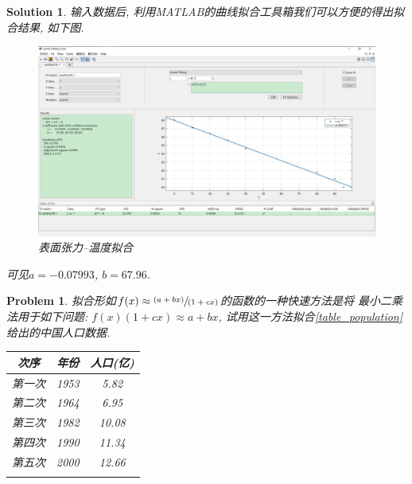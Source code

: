 \documentclass[a4paper, 12pt]{ctexart}
\let\oldtable\table
\let\oldendtable\endtable
\renewenvironment{table}
    {\par\nolinenumbers\oldtable}
    {\oldendtable\endnolinenumbers\par}
\theoremstyle{plain}
\newtheorem{problem}{Problem}[section]
\theoremstyle{plain}
\theoremstyle{plain}
\theoremstyle{nonumberplain}
\newtheorem{solution}{Solution}
\begin{document}
    \begin{solution}
        输入数据后, 利用MATLAB的曲线拟合工具箱我们可以方便的得出拟合结果, 如下图.
        \begin{figure}[H]
            \centering
            \includegraphics[scale=0.32]{tension.jpg}
            \caption{表面张力--温度拟合}
        \end{figure}
        可见$a = -0.07993$, $b = 67.96$.
    \end{solution}

    \begin{problem}
        拟合形如$f(x) \approx \sfrac{(a+bx)}{(1+cx)}$的函数的一种快速方法是将
        最小二乘法用于如下问题: $f(x)(1+cx)\approx a+bx$,
        试用这一方法拟合\ref{table_population}给出的中国人口数据.
        \begin{table}[H]
            \begin{center}
                \caption{中国人口数据}
                \label{table_population}
                \begin{tabular}{ccc}
                    \Xhline{1.2pt}
                    次序 & 年份 & 人口(亿)\\
                    \hline
                    第一次 & 1953 & 5.82\\
                    第二次 & 1964 & 6.95\\
                    第三次 & 1982 & 10.08\\
                    第四次 & 1990 & 11.34\\
                    第五次 & 2000 & 12.66\\
                    \Xhline{1.2pt}
                \end{tabular}
            \end{center}
        \end{table}
    \end{problem}
\end{document}
